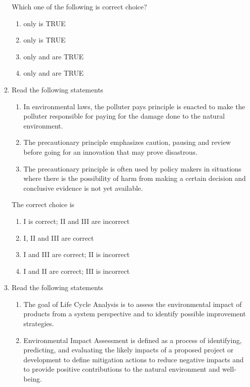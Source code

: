 \documentclass[journal,12pt,onecolumn]{IEEEtran}
\theoremstyle{remark}
\begin{document}
\begin{enumerate}[start=1, label={Q\arabic*.}]
Which one of the following is correct choice?

\begin{enumerate}[label=(\Alph*)]
\item only  is TRUE
\item only  is TRUE
\item only  and  are TRUE
\item only  and  are TRUE
\end{enumerate}
\hfill{}
\item Read the following statements

\begin{enumerate}[label=\Roman*.]
\item In environmental laws, the polluter pays principle is enacted to make the polluter responsible for paying for the damage done to the natural environment.
\item The precautionary principle emphasizes caution, pausing and review before going for an innovation that may prove disastrous.
\item The precautionary principle is often used by policy makers in situations where there is the possibility of harm from making a certain decision and conclusive evidence is not yet available.
\end{enumerate}

The correct choice is

\begin{enumerate}[label=(\Alph*)]
\item I is correct; II and III are incorrect
\item I, II and III are correct
\item I and III are correct; II is incorrect
\item I and II are correct; III is incorrect
\end{enumerate}
\hfill{}
\item Read the following statements

\begin{enumerate}[label=\Roman*.]
\item The goal of Life Cycle Analysis  is to assess the environmental impact of products from a system perspective and to identify possible improvement strategies.
\item Environmental Impact Assessment  is defined as a process of identifying, predicting, and evaluating the likely impacts of a proposed project or development to define mitigation actions to reduce negative impacts and to provide positive contributions to the natural environment and well-being.
\end{enumerate}


\end{enumerate}
\end{document}
